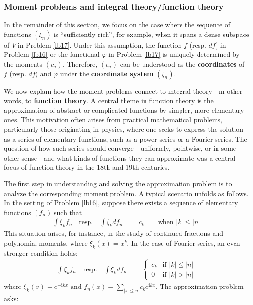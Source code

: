 \documentclass[12pt,b5paper,notitlepage]{article}
\theoremstyle{definition}
\theoremstyle{plain}
\newcommand{\im}{\mathbf{i}}
\numberwithin{equation}{section}
\begin{document}
\subsubsection{Moment problems and integral theory/function theory}\label{lb19}


In the remainder of this section, we focus on the case where the sequence of functions $(\xi_n)$ is ``sufficiently rich'', for example, when it spans a dense subspace of $V$ in Problem \ref{lb17}. Under this assumption, the function $f$ (resp. $df$) in Problem \ref{lb16} or the functional $\varphi$ in Problem \ref{lb17} is uniquely determined by the moments $(c_n)$. Therefore, $(c_n)$ can be understood as the \textbf{coordinates} of $f$ (resp. $df$) and $\varphi$ under the \textbf{coordinate system} $(\xi_n)$.


We now explain how the moment problems connect to integral theory---in other words, to \textbf{function theory}. A central theme in function theory is the approximation of abstract or complicated functions by simpler, more elementary ones. This motivation often arises from practical mathematical problems, particularly those originating in physics, where one seeks to express the solution as a series of elementary functions, such as a power series or a Fourier series. The question of how such series should converge---uniformly, pointwise, or in some other sense---and what kinds of functions they can approximate was a central focus of function theory in the 18th and 19th centuries.


The first step in understanding and solving the approximation problem is to analyze the corresponding moment problem. A typical scenario unfolds as follows. In the setting of Problem \ref{lb16}, suppose there exists a sequence of elementary functions $(f_n)$ such that
\begin{align}\label{eq5}
\int \xi_k f_n\quad\text{resp.}\quad \int \xi_kdf_n\quad=c_k\qquad \text{when $|k|\leq |n|$}
\end{align}
This situation arises, for instance, in the study of continued fractions and polynomial moments, where $\xi_k(x)=x^k$. In the case of Fourier series, an even stronger condition holds:
\begin{align}\label{eq6}
\int \xi_k f_n\quad\text{resp.}\quad\int \xi_k df_n\quad=\left\{
\begin{array}{ll}
c_k&\text{if }|k|\leq |n|\\[0.5ex]
0&\text{if }|k|>|n|
\end{array}
\right.
\end{align}
where $\xi_k(x)=e^{-\im kx}$ and $f_n(x)=\sum_{|k|\leq n}c_k e^{\im kx}$. The approximation problem asks:
\end{document}
